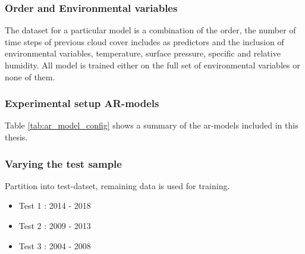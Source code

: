 \subsubsection{Order and Environmental variables}
The dataset for a particular model is a combination of the order, the number of time steps of previous cloud cover includes as predictors and the inclusion of environmental variables, temperature, surface pressure, specific and relative humidity. All model is trained either on the full set of environmental variables or none of them.

\subsubsection{Experimental setup AR-models}
Table \ref{tab:ar_model_config} shows a summary of the \acrshort{ar}-models included in this thesis. 

\begin{table}[h]
    \centering
    \caption{Configuration of \acrshort{ar}-models. $\times$ denoted not applied, \checked denotes applied}
    \label{tab:ar_model_config}
\end{table}


\subsubsection{Varying the test sample}
Partition into test-datset, remaining data is used for training. 
\begin{itemize}[noitemsep, topsep=0pt]
    \item Test 1 : 2014 - 2018
    \item Test 2 : 2009 - 2013
    \item Test 3 : 2004 - 2008
\end{itemize}

